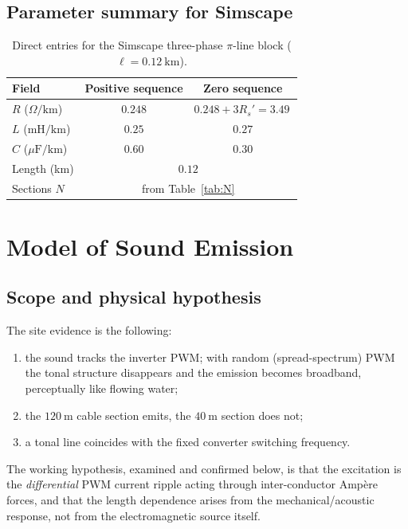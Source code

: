 \documentclass[11pt,a4paper,oneside]{book}
\begin{document}
\begin{onehalfspace}
\begin{appendices}
\section{Parameter summary for Simscape}
\begin{table}[h]
	\centering
	\caption{Direct entries for the Simscape three-phase $\pi$-line block
		($\ell=0.12\ \mathrm{km}$).}
	\begin{tabular}{@{}lcc@{}}
		\toprule
		Field & Positive sequence & Zero sequence \\
		\midrule
		$R$ ($\Omega/\mathrm{km}$) & $0.248$ & $0.248 + 3R_s' = 3.49$\,\footnotemark \\
		$L$ ($\mathrm{mH/km}$) & $0.25$ & $0.27$ \\
		$C$ ($\mu\mathrm{F/km}$) & $0.60$ & $0.30$ \\
		Length (km) & \multicolumn{2}{c}{$0.12$} \\
		Sections $N$ & \multicolumn{2}{c}{from Table~\ref{tab:N}} \\
		\bottomrule
	\end{tabular}
\end{table}

\chapter{Model of Sound Emission}
\section{Scope and physical hypothesis}
The site evidence is the following:
\begin{enumerate}[leftmargin=*,nosep]
	\item the sound tracks the inverter PWM; with random (spread-spectrum) PWM the
	tonal structure disappears and the emission becomes broadband, perceptually like
	flowing water;
	\item the $120\ \mathrm{m}$ cable section emits, the $40\ \mathrm{m}$ section does
	not;
	\item a tonal line coincides with the fixed converter switching frequency.
\end{enumerate}
The working hypothesis, examined and confirmed below, is that the excitation is the
\emph{differential} PWM current ripple acting through inter-conductor Amp\`ere
forces, and that the length dependence arises from the mechanical/acoustic
response, not from the electromagnetic source itself.


\end{appendices}
\end{onehalfspace}
\end{document}
